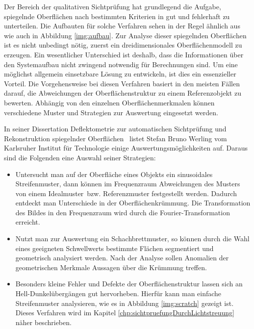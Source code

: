 Der Bereich der qualitativen Sichtprüfung hat grundlegend die Aufgabe, spiegelnde Oberflächen nach bestimmten Kriterien in gut und fehlerhaft zu unterteilen.
Die Aufbauten für solche Verfahren sehen in der Regel ähnlich aus wie auch in Abbildung \ref{img:aufbau}.
Zur Analyse dieser spiegelnden Oberflächen ist es nicht unbedingt nötig, zuerst ein dreidimensionales Oberflächenmodell zu erzeugen.
Ein wesentlicher Unterschied ist deshalb, dass die Informationen über den Systemaufbau nicht zwingend notwendig für Berechnungen sind.
Um eine möglichst allgemein einsetzbare Lösung zu entwickeln, ist dies ein essenzieller Vorteil.
Die Vorgehensweise bei diesen Verfahren basiert in den meisten Fällen darauf, die Abweichungen der Oberflächenstruktur zu einem Referenzobjekt zu bewerten.
Abhängig von den einzelnen Oberflächenmerkmalen können verschiedene Muster und Strategien zur Auswertung eingesetzt werden.

\p
In seiner Dissertation \glqq Deflektometrie zur automatischen Sichtprüfung und Rekonstruktion spiegelnder Oberflächen\grqq ~\cite{kit_werling} listet Stefan Bruno Werling vom Karlsruher Institut für Technologie einige Auswertungsmöglichkeiten auf.
Daraus sind die Folgenden eine Auswahl seiner Strategien:

\begin{itemize}
	\item Untersucht man auf der Oberfläche eines Objekts ein sinusoidales Streifenmuster, dann können im Frequenzraum Abweichungen des Musters von einem \glqq Idealmuster\grqq ~bzw. Referenzmuster festgestellt werden.
	Dadurch entdeckt man Unterschiede in der Oberflächenkrüm\-mung.
	Die Transformation des Bildes in den Frequenzraum wird durch die Fourier-Transformation erreicht.
	
	\item Nutzt man zur Auswertung ein Schachbrettmuster, so können durch die Wahl eines geeigneten Schwellwerts bestimmte Flächen segmentiert und geometrisch analysiert werden.
	Nach der Analyse sollen Anomalien der geometrischen Merkmale Aussagen über die Krümmung treffen.
	
	\item Besonders kleine Fehler und Defekte der Oberflächenstruktur lassen sich an Hell-Dunkelübergängen gut hervorheben.
	Hierfür kann man einfache Streifenmuster analysieren, wie es in Abbildung \ref{img:scratch} gezeigt ist.
	Dieses Verfahren wird im Kapitel \ref{chp:sichtpruefungDurchLichtstreuung} näher beschrieben.
\end{itemize}

